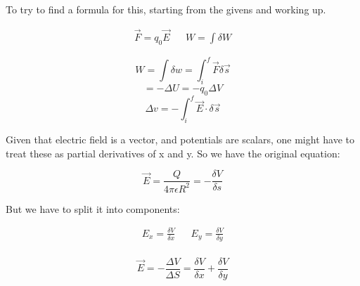 \documentclass{article}
\begin{document}
To try to find a formula for this, starting from the givens and working up.

\begin{align*}
    \vec{F} = q_0 \vec{E} &  & W = \int \delta W
\end{align*}

$$W = \int \delta w =  \int_{i}^{f} \vec{F} \delta \vec{s}$$
$$ = - \Delta U = - q_0 \Delta V $$
$$ \Delta v = \boxed{-\int_{i}^{f} \vec{E} \cdot \delta \vec{s}}$$

Given that electric field is a vector, and potentials are scalars, one might have to treat these as partial derivatives of x and y. So we have the original equation:

$$\vec{E} = \frac{Q}{4 \pi \epsilon R^2} = - \frac{\delta V}{\delta s}$$

But we have to split it into components:

\begin{align*}
    E_x = \frac{\delta V}{\delta x} &  & E_y = \frac{\delta V}{ \delta y} \\
\end{align*}

$$  \vec{E} = - \frac{\Delta V}{\Delta S} = \frac{\delta V}{\delta x} + \frac{\delta V}{\delta y}$$
\end{document}

